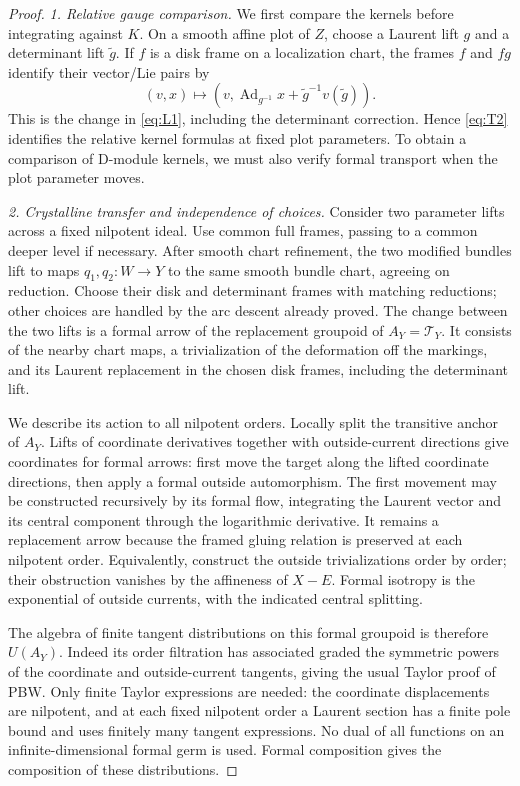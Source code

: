 \documentclass[11pt]{article}
\numberwithin{equation}{section}
\theoremstyle{definition}
\theoremstyle{remark}
\begin{document}
\begin{proof}
\emph{1. Relative gauge comparison.}
We first compare the kernels before integrating against $K$.  On a
smooth affine plot of $Z$, choose a Laurent lift $g$ and a determinant
lift $\widetilde g$.  If $f$ is a disk frame on a localization chart,
the frames $f$ and $fg$ identify their vector/Lie pairs by
\begin{equation}\label{loc:gauge}
 (v,x)\longmapsto
 \left(v,\operatorname{Ad}_{g^{-1}}x+
                   \widetilde g^{-1}v(\widetilde g)\right).
\end{equation}
This is the change in \eqref{eq:L1}, including the determinant
correction.  Hence \eqref{eq:T2} identifies the relative kernel
formulas at fixed plot parameters.  To obtain a comparison of
D-module kernels, we must also verify formal transport when the plot
parameter moves.

\emph{2. Crystalline transfer and independence of choices.}
Consider two parameter lifts across a fixed nilpotent ideal.  Use
common full frames, passing to a common deeper level if necessary.
After smooth chart refinement, the two modified bundles lift to maps
$q_1,q_2:W\to Y$ to the same smooth bundle chart, agreeing on reduction.
Choose their disk and determinant frames with matching reductions;
other choices are handled by the arc descent already proved.  The
change between the two lifts is a formal arrow of the replacement
groupoid of $A_Y=\mathcal T_Y$.  It consists of the nearby chart maps,
a trivialization of the deformation off the markings, and its Laurent
replacement in the chosen disk frames, including the determinant lift.

We describe its action to all nilpotent orders.  Locally split the
transitive anchor of $A_Y$.  Lifts of coordinate derivatives together
with outside-current directions give coordinates for formal arrows:
first move the target along the lifted coordinate directions, then
apply a formal outside automorphism.  The first movement may be
constructed recursively by its formal flow, integrating the Laurent
vector and its central component through the logarithmic derivative.
It remains a replacement arrow because the framed gluing relation is
preserved at each nilpotent order.  Equivalently, construct the outside
trivializations order by order; their obstruction vanishes by the
affineness of $X-E$.  Formal isotropy is the exponential of outside
currents, with the indicated central splitting.

The algebra of finite tangent distributions on this formal groupoid
is therefore $U(A_Y)$.  Indeed its order filtration has associated
graded the symmetric powers of the coordinate and outside-current
tangents, giving the usual Taylor proof of PBW.  Only finite Taylor
expressions are needed: the coordinate displacements are nilpotent,
and at each fixed nilpotent order a Laurent section has a finite pole
bound and uses finitely many tangent expressions.  No dual of all
functions on an infinite-dimensional formal germ is used.  Formal
composition gives the composition of these distributions.


\end{proof}
\end{document}
